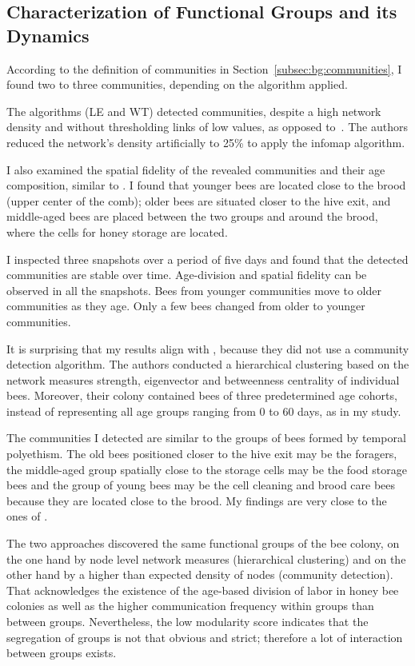 \subsection{Characterization of Functional Groups and its Dynamics}
According to the definition of communities in Section~\ref{subsec:bg:communities}, I found two to three communities, depending on the algorithm applied.

The algorithms (LE and WT) detected communities, despite a high network density and without thresholding links of low values, as opposed to~\textcite{mersch2013tracking}.
The authors reduced the network's density artificially to 25\% to apply the infomap algorithm.

I also examined the spatial fidelity of the revealed communities and their age composition, similar to \textcite{baracchi2014socio}.
I found that younger bees are located close to the brood (upper center of the comb); older bees are situated closer to the hive exit, and middle-aged bees are placed between the two groups and around the brood, where the cells for honey storage are located.

I inspected three snapshots over a period of five days and found that the detected communities are stable over time.
Age-division and spatial fidelity can be observed in all the snapshots.
Bees from younger communities move to older communities as they age. Only a few bees changed from older to younger communities.

It is surprising that my results align with \textcite{baracchi2014socio}, because they did not use a community detection algorithm.
The authors conducted a hierarchical clustering based on the network measures strength, eigenvector and betweenness centrality of individual bees.
Moreover, their colony contained bees of three predetermined age cohorts, instead of representing all age groups ranging from 0 to 60 days, as in my study.

The communities I detected are similar to the groups of bees formed by temporal polyethism.
The old bees positioned closer to the hive exit may be the foragers, the middle-aged group spatially close to the storage cells may be the food storage bees and the group of young bees  may be the cell cleaning and brood care bees because they are located close to the brood. My findings are very close to the ones of \textcite{baracchi2014socio}.

The two approaches discovered the same functional groups of the bee colony, on the one hand by node level network measures (hierarchical clustering) and on the other hand by a higher than expected density of nodes (community detection).
That acknowledges the existence of the age-based division of labor in honey bee colonies as well as the higher communication frequency within groups than between groups.
Nevertheless, the low modularity score indicates that the segregation of groups is not that obvious and strict; therefore a lot of interaction between groups exists.

